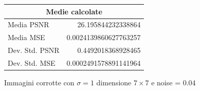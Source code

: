 \begin{figure}[H]
\begin{minipage}[h]{0.4\textwidth}
{\begin{tabular}{|lr|}
            \multicolumn{2}{|c|}{\textbf{Medie calcolate}} \\ \hline
            Media PSNR           & 26.195844232338864         \\
            Media MSE            & 0.0024139860627763257       \\
            Dev. Std. PSNR       & 0.4492018368928465       \\
            Dev. Std. MSE        & 0.0002491578891141964     \\ \hline
            \end{tabular}
        }
    \end{minipage}
    \captionsetup{labelformat=andtable}
    \caption{Immagini corrotte con $\sigma = 1$ dimensione $7 \times 7$ e noise = 0.04}
\end{figure}

